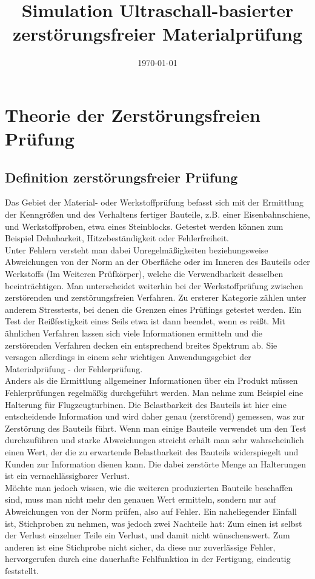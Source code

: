 \documentclass[reducespace,stylepage,semiarbeit]{spezidoc}
\title{Simulation Ultraschall-basierter zerstörungsfreier Materialprüfung}
\date{\today}
\begin{document}
\maketitlepage
\newpage
\tableofcontents
\thispagestyle{empty}
\newpage

\setcounter{page}{1}

\section{Theorie der Zerstörungsfreien Prüfung}
\subsection{Definition zerstörungsfreier Prüfung}
Das Gebiet der Material- oder Werkstoffprüfung befasst sich mit der Ermittlung der Kenngrößen und des Verhaltens fertiger Bauteile, z.B. einer Eisenbahnschiene, und Werkstoffproben, etwa eines Steinblocks. Getestet werden können zum Beispiel Dehnbarkeit, Hitzebeständigkeit oder Fehlerfreiheit.\\ 
Unter Fehlern versteht man dabei Unregelmäßigkeiten beziehungsweise Abweichungen von der Norm an der Oberfläche oder im Inneren des Bauteils oder Werkstoffs (Im Weiteren Prüfkörper), welche die Verwendbarkeit desselben beeinträchtigen. 
Man unterscheidet weiterhin bei der Werkstoffprüfung zwischen zerstörenden und zerstörungsfreien Verfahren. Zu ersterer Kategorie zählen unter anderem Stresstests, bei denen die Grenzen eines Prüflings getestet werden. Ein Test der Reißfestigkeit eines Seils etwa ist dann beendet, wenn es reißt. Mit ähnlichen Verfahren lassen sich viele Informationen ermitteln und die zerstörenden Verfahren decken ein entsprechend breites Spektrum ab. Sie versagen allerdings in einem sehr wichtigen Anwendungsgebiet der Materialprüfung - der Fehlerprüfung.\\
Anders als die Ermittlung allgemeiner Informationen über ein Produkt müssen Fehlerprüfungen regelmäßig durchgeführt werden. Man nehme zum Beispiel eine Halterung für Flugzeugturbinen. Die Belastbarkeit des Bauteils ist hier eine entscheidende Information und wird daher genau (zerstörend) gemessen, was zur Zerstörung des Bauteils führt. Wenn man einige Bauteile verwendet um den Test durchzuführen und starke Abweichungen streicht erhält man sehr wahrscheinlich einen Wert, der die zu erwartende Belastbarkeit des Bauteils widerspiegelt und Kunden zur Information dienen kann. Die dabei zerstörte Menge an Halterungen ist ein vernachlässigbarer Verlust.\\
Möchte man jedoch wissen, wie die weiteren produzierten Bauteile beschaffen sind, muss man nicht mehr den genauen Wert ermitteln, sondern nur auf Abweichungen von der Norm prüfen, also auf Fehler. Ein naheliegender Einfall ist, Stichproben zu nehmen, was jedoch zwei Nachteile hat: Zum einen ist selbst der Verlust einzelner Teile ein Verlust, und damit nicht wünschenswert. Zum anderen ist eine Stichprobe nicht sicher, da diese nur zuverlässige Fehler, hervorgerufen durch eine dauerhafte Fehlfunktion in der Fertigung, eindeutig feststellt.\\
\end{document}
